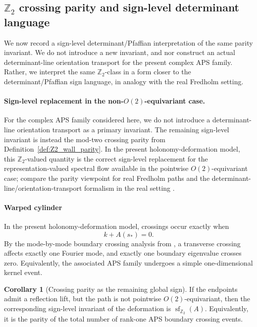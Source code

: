 \documentclass[11pt]{article}
\theoremstyle{definition}
\newtheorem{corollary}[theorem]{Corollary}
\numberwithin{equation}{section}
\begin{document}
\subsection{\texorpdfstring{$\mathbb Z_2$}{Z2} crossing parity and sign-level determinant language}
\label{subsec:pfaffian_Z2_tight}

We now record a sign-level determinant/Pfaffian interpretation of the same parity invariant. We do not introduce a new invariant, and nor construct an actual determinant-line orientation transport for the present complex APS family. Rather, we interpret the same \(\mathbb Z_2\)-class in a form closer to the determinant/Pfaffian sign language, in analogy with the real Fredholm setting.




\paragraph{Sign-level replacement in the non-\texorpdfstring{$O(2)$}{O(2)}-equivariant case.}
For the complex APS family considered here, we do not introduce a determinant-line orientation transport as a primary invariant. The remaining sign-level invariant is instead the mod-two crossing parity from Definition~\ref{def:Z2_wall_parity}. In the present
holonomy-deformation model, this \(\mathbb Z_2\)-valued quantity is the correct sign-level replacement for the representation-valued spectral flow available in the pointwise \(O(2)\)-equivariant case; compare the parity viewpoint for real Fredholm paths \cite{DollSchulzBaldesWaterstraat2019} and the determinant-line/orientation-transport formalism in the real setting \cite{NicolaescuOT}.



\paragraph{Warped cylinder}
In the present holonomy-deformation model, crossings occur exactly when
\begin{equation}\label{eq:wall_hit_repeat_section8}
k+A(s_*)=0.
\end{equation}
By the mode-by-mode boundary crossing analysis from
\cite{KS}, a transverse crossing affects exactly one Fourier
mode, and exactly one boundary eigenvalue crosses zero. Equivalently, the associated APS family undergoes a simple one-dimensional kernel event.

\begin{corollary}[Crossing parity as the remaining global sign]
\label{cor:endpoint_sign_wall_parity}
If the endpoints admit a reflection lift, but the path is not pointwise
\(O(2)\)-equivariant, then the corresponding sign-level invariant of the deformation is
\(\operatorname{sf}_{\mathbb Z_2}(A)\). Equivalently, it is the parity of the total number
of rank-one APS boundary crossing events.
\end{corollary}
\end{document}
